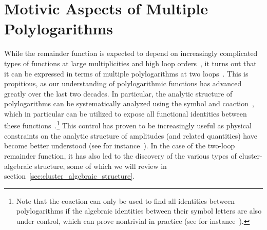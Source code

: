 \documentclass[11pt]{article}
\begin{document}
\section{Motivic Aspects of Multiple Polylogarithms}
\label{sec:motivic_aspects_polylogs}

While the remainder function is expected to depend on increasingly complicated types of functions at large multiplicities and high loop orders~\cite{Paulos:2012nu,CaronHuot:2012ab,Nandan:2013ip,Chicherin:2017bxc,Bourjaily:2017bsb,Bourjaily:2018ycu,Bourjaily:2018yfy,Bourjaily:2019hmc}, it turns out that it can be expressed in terms of multiple polylogarithms at two loops~\cite{CaronHuot:2011ky}. This is propitious, as our understanding of polylogarithmic functions has advanced greatly over the last two decades. In particular, the analytic structure of polylogarithms can be systematically analyzed using the symbol and coaction~\cite{Goncharov:2001iea,Brown:2009qja,Goncharov:2010jf,Brown1102.1312,Brown:2015fyf}, which in particular can be utilized to expose all functional identities between these functions~\cite{Goncharov:2005sla,2011arXiv1101.4497D,Brown:2011ik,Duhr:2011zq,Duhr:2012fh}.\footnote{Note that the coaction can only be used to find all identities between polylogarithms if the algebraic identities between their symbol letters are also under control, which can prove nontrivial in practice (see for instance~\cite{Bourjaily:2019igt}).} This control has proven to be increasingly useful as physical constraints on the analytic structure of amplitudes (and related quantities) have become better understood (see for instance~\cite{Bloch:2010gk,Abreu:2014cla,Bloch:2015efx,Abreu:2017ptx,Caron-Huot:2019bsq,Bourjaily:2019exo,Bourjaily:2020wvq,Benincasa:2020aoj}). In the case of the two-loop remainder function, it has also led to the discovery of the various types of cluster-algebraic structure, some of which we will review in section~\ref{sec:cluster_algebraic_structure}. 

\end{document}
